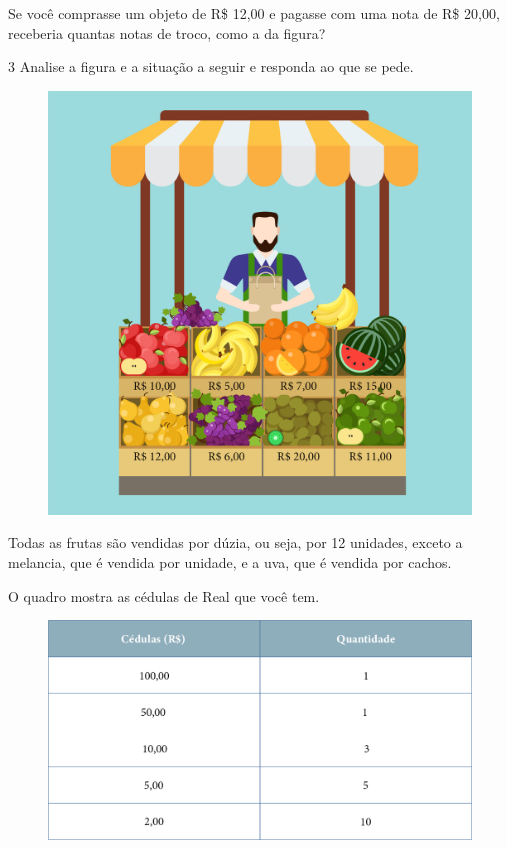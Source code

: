 Se você comprasse um objeto de R\$ 12,00 e pagasse com uma nota de R\$
20,00, receberia quantas notas de troco, como a da figura?


\num{3} Analise a figura e a situação a seguir e responda ao que se pede.



\begin{figure}[htpb!]
\centering
\includegraphics[width=.6\textwidth]{./media/image65.png}
\end{figure}

Todas as frutas são vendidas por dúzia, ou seja, por 12 unidades, exceto
a melancia, que é vendida por unidade, e a uva, que é vendida por cachos.

O quadro mostra as cédulas de Real que você tem.

\begin{figure}[htpb!]
\includegraphics[width=\textwidth]{./media/image66.png}
\end{figure}

